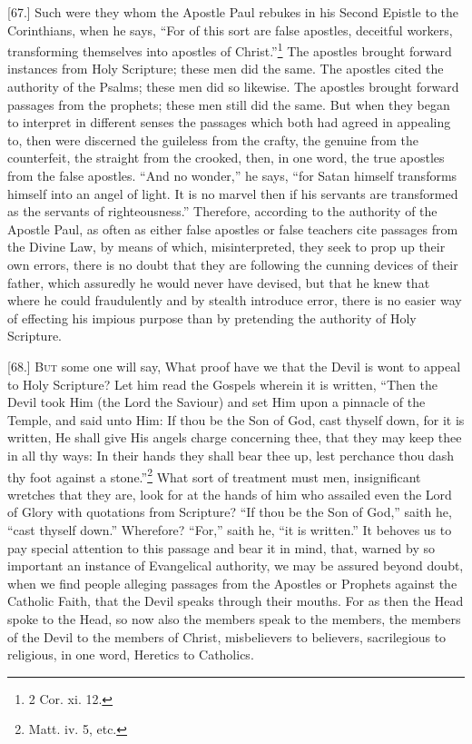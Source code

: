 [67.] Such were they whom the Apostle Paul rebukes in his Second Epistle to the Corinthians, when he says, “For of this sort are false apostles, deceitful workers, transforming themselves into apostles of Christ.”\footnote{2 Cor. xi. 12.} The apostles brought forward instances from Holy Scripture; these men did the same. The apostles cited the authority of the Psalms; these men did so likewise. The apostles brought forward passages from the prophets; these men still did the same. But when they began to interpret in different senses the passages which both had agreed in appealing to, then were discerned the guileless from the crafty, the genuine from the counterfeit, the straight from the crooked, then, in one word, the true apostles from the false apostles. “And no wonder,” he says, “for Satan himself transforms himself into an angel of light. It is no marvel then if his servants are transformed as the servants of righteousness.” Therefore, according to the authority of the Apostle Paul, as often as either false apostles or false teachers cite passages from the Divine Law, by means of which, misinterpreted, they seek to prop up their own errors, there is no doubt that they are following the cunning devices of their father, which assuredly he would never have devised, but that he knew that where he could fraudulently and by stealth introduce error, there is no easier way of effecting his impious purpose than by pretending the authority of Holy Scripture.


[68.] \textsc{But} some one will say, What proof have we that the Devil is wont to appeal to Holy Scripture? Let him read the Gospels wherein it is written, “Then the Devil took Him (the Lord the Saviour) and set Him upon a pinnacle of the Temple, and said unto Him: If thou be the Son of God, cast thyself down, for it is written, He shall give His angels charge concerning thee, that they may keep thee in all thy ways: In their hands they shall bear thee up, lest perchance thou dash thy foot against a stone.”\footnote{Matt. iv. 5, etc.} What sort of treatment must men, insignificant wretches that they are, look for at the hands of him who assailed even the Lord of Glory with quotations from Scripture? “If thou be the Son of God,” saith he, “cast thyself down.” Wherefore? “For,” saith he, “it is written.” It behoves us to pay special attention to this passage and bear it in mind, that, warned by so important an instance of Evangelical authority, we may be assured beyond doubt, when we find people alleging passages from the Apostles or Prophets against the Catholic Faith, that the Devil speaks through their mouths. For as then the Head spoke to the Head, so now also the members speak to the members, the members of the Devil to the members of Christ, misbelievers to believers, sacrilegious to religious, in one word, Heretics to Catholics.

